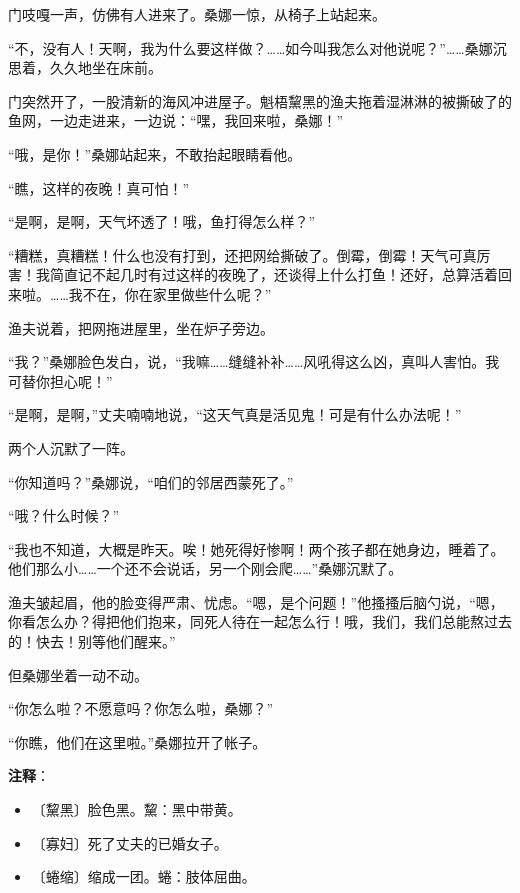\documentclass[12pt,UTF-8,openany]{ctexbook}
\begin{document}
\begin{large}
    门吱嘎一声，仿佛有人进来了。桑娜一惊，从椅子上站起来。
    
    “不，没有人！天啊，我为什么要这样做？……如今叫我怎么对他说呢？”……桑娜沉思着，久久地坐在床前。
    
    门突然开了，一股清新的海风冲进屋子。魁梧黧黑的渔夫拖着湿淋淋的被撕破了的鱼网，一边走进来，一边说：“嘿，我回来啦，桑娜！”
    
    “哦，是你！”桑娜站起来，不敢抬起眼睛看他。
    
    “瞧，这样的夜晚！真可怕！”
    
    “是啊，是啊，天气坏透了！哦，鱼打得怎么样？”
    
    “糟糕，真糟糕！什么也没有打到，还把网给撕破了。倒霉，倒霉！天气可真厉害！我简直记不起几时有过这样的夜晚了，还谈得上什么打鱼！还好，总算活着回来啦。……我不在，你在家里做些什么呢？”
    
    渔夫说着，把网拖进屋里，坐在炉子旁边。
    
    “我？”桑娜脸色发白，说，“我嘛……缝缝补补……风吼得这么凶，真叫人害怕。我可替你担心呢！”
    
    “是啊，是啊，”丈夫喃喃地说，“这天气真是活见鬼！可是有什么办法呢！”
    
    两个人沉默了一阵。
    
    “你知道吗？”桑娜说，“咱们的邻居西蒙死了。”
    
    “哦？什么时候？”
    
    “我也不知道，大概是昨天。唉！她死得好惨啊！两个孩子都在她身边，睡着了。他们那么小……一个还不会说话，另一个刚会爬……”桑娜沉默了。
    
    渔夫皱起眉，他的脸变得严肃、忧虑。“嗯，是个问题！”他搔搔后脑勺说，“嗯，你看怎么办？得把他们抱来，同死人待在一起怎么行！哦，我们，我们总能熬过去的！快去！别等他们醒来。”
    
    但桑娜坐着一动不动。
    
    “你怎么啦？不愿意吗？你怎么啦，桑娜？”
    
    “你瞧，他们在这里啦。”桑娜拉开了帐子。
    
\end{large}


\newpage

\textbf{注释}：

\vspace{-1em}

\begin{itemize}
    \setlength\itemsep{-0.2em}
    \item 〔黧黑〕脸色黑。黧：黑中带黄。
    \item 〔寡妇〕死了丈夫的已婚女子。
    \item 〔蜷缩〕缩成一团。蜷：肢体屈曲。
\end{itemize}
\end{document}
